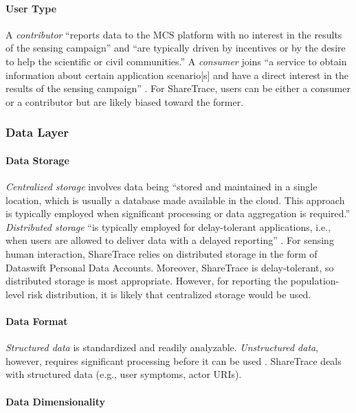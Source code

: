\paragraph{User Type}

A \emph{contributor} ``reports data to the MCS platform with no interest in the results of the sensing campaign'' and ``are typically driven by incentives or by the desire to help the scientific or civil communities.'' A \emph{consumer} joins ``a service to obtain information about certain application scenario[s] and have a direct interest in the results of the sensing campaign'' \citep{Capponi2019}. For ShareTrace, users can be either a consumer or a contributor but are likely biased toward the former.

\subsubsection{Data Layer}

\paragraph{Data Storage}

\emph{Centralized storage} involves data being ``stored and maintained in a single location, which is usually a database made available in the cloud. This approach is typically employed when significant processing or data aggregation is required.'' \emph{Distributed storage} ``is typically employed for delay-tolerant applications, i.e., when users are allowed to deliver data with a delayed reporting'' \citep{Capponi2019}. For sensing human interaction, ShareTrace relies on distributed storage in the form of Dataswift Personal Data Accounts. Moreover, ShareTrace is delay-tolerant, so distributed storage is most appropriate. However, for reporting the population-level risk distribution, it is likely that centralized storage would be used.

\paragraph{Data Format}

\emph{Structured data} is standardized and readily analyzable. \emph{Unstructured data}, however, requires significant processing before it can be used \citep{Capponi2019}. ShareTrace deals with structured data (e.g., user symptoms, actor URIs).

\paragraph{Data Dimensionality}

